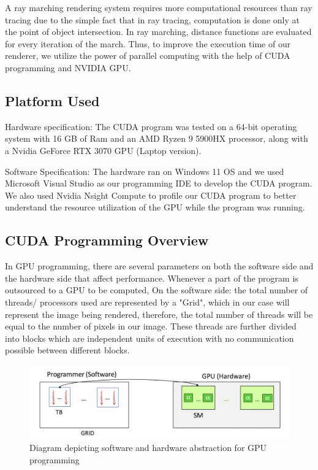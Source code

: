 \documentclass[sigconf, nonacm]{acmart}
\begin{document}
A ray marching rendering system requires more computational resources than ray tracing due to the simple fact that in ray tracing, computation is done only at the point of object intersection. In ray marching, distance functions are evaluated for every iteration of the march. Thus, to improve the execution time of our renderer, we utilize the power of parallel computing with the help of CUDA programming and NVIDIA GPU.

\subsection{Platform Used}
Hardware specification:
The CUDA program was tested on a 64-bit operating system with 16 GB of Ram and an AMD Ryzen 9 5900HX processor, along with a Nvidia GeForce RTX 3070 GPU (Laptop version).

Software Specification: The hardware ran on Windows 11 OS and we used Microsoft Visual Studio as our programming IDE to develop the CUDA program. We also used Nvidia Nsight Compute to profile our CUDA program to better understand the resource utilization of the GPU while the program was running.

\subsection{CUDA Programming Overview}

In GPU programming, there are several parameters on both the software side and the hardware side that affect performance. Whenever a part of the program is outsourced to a GPU to be computed, On the software side: the total number of threads/ processors used are represented by a "Grid", which in our case will represent the image being rendered, therefore, the total number of threads will be equal to the number of pixels in our image. These threads are further divided into blocks which are independent units of execution with no communication possible between different blocks. 

\begin{figure}[h]
  \centering
  \includegraphics[width=1\linewidth]{images/GPU_description.png}
  \caption{Diagram depicting software and hardware abstraction for GPU programming}
\end{figure}
\end{document}
